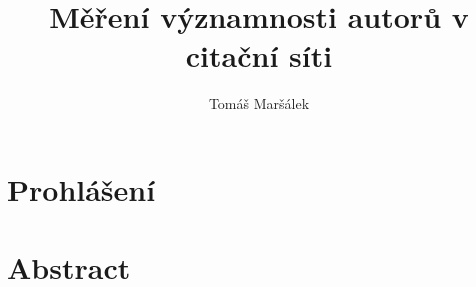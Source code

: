 \documentclass{bakalarka}
\author{Tomáš Maršálek}
\title{Měření významnosti autorů v citační síti}
\begin{document}
\shorthandoff{-}
\pagestyle{fancy}

\renewcommand{\chaptermark}[1]{\markboth{\textit{#1}}{}}
\cfoot{\thepage}
\lhead{\leftmark}
\rhead{\rightmark}
\maketitle
\chapter*{Prohlášení}
\thispagestyle{empty}

\chapter*{Abstract}
\thispagestyle{empty}
\end{document}
